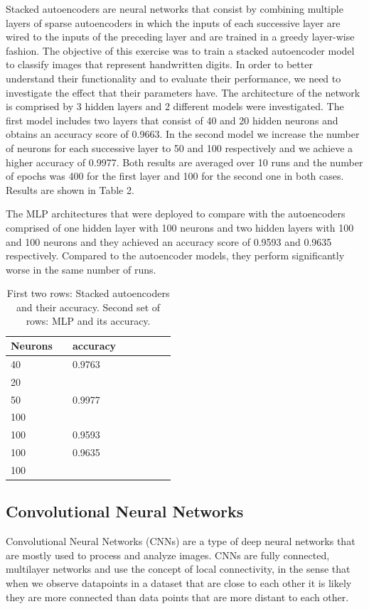 \documentclass[11pt,conference,compsoc]{IEEEtran}
\begin{document}
Stacked autoencoders are neural networks that consist by combining multiple layers of sparse autoencoders in which the inputs of each successive layer are wired to the inputs of the preceding layer and are trained in a greedy layer-wise fashion. The objective of this exercise was to train a stacked autoencoder model to classify images that represent handwritten digits. In order to better understand their functionality and to evaluate their performance, we need to investigate the effect that their parameters have. The architecture of the network is comprised by 3 hidden layers and 2 different models were investigated. The first model includes two layers that consist of 40 and 20 hidden neurons and obtains an accuracy score of 0.9663. In the second model we increase the number of neurons for each successive layer to 50 and 100 respectively and we achieve a higher accuracy of 0.9977. Both results are averaged over 10 runs and the number of epochs was 400 for the first layer and 100 for the second one in both cases. Results are shown in Table 2.

The MLP architectures that were deployed to compare with the autoencoders comprised of one hidden layer with 100 neurons and two hidden layers with 100 and 100 neurons and they achieved an accuracy score of 0.9593 and 0.9635 respectively. Compared to the autoencoder models, they perform significantly worse in the same number of runs.
\begin{table}
\begin{subtable}[t]{0.48\textwidth}
\centering
\begin{tabular}[t]{l l l l l l |l l}
\toprule
 Neurons&    &accuracy\\
\midrule
  40 &  &0.9763 &\\
  20  & &\\
\midrule                                                  
\midrule
  50 &  & 0.9977 &\\
  100  & &\\
\midrule
\midrule
  100 &  & 0.9593&\\
\midrule
\midrule
  100 &  & 0.9635\\
  100  & &\\
\bottomrule
\end{tabular}
\end{subtable}
\caption{First two rows: Stacked autoencoders and their accuracy. Second set of rows: MLP and its accuracy.}
\label{tableaut}
\end{table}

\subsection{Convolutional Neural Networks}
Convolutional Neural Networks (CNNs) are a type of deep neural networks that are mostly used to process and analyze images. CNNs are fully connected, multilayer networks and use the concept of local connectivity, in the sense that when we observe datapoints in a dataset that are close to each other it is likely they are more connected than data points that are more distant to each other.
\end{document}
